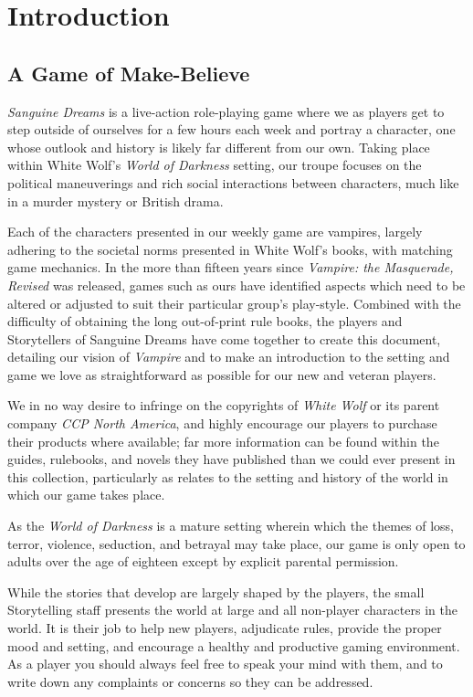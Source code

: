 \section{Introduction}
\label{sec:introduction}
\subsection{A Game of Make-Believe}
\emph{Sanguine Dreams} is a live-action role-playing game where we as players get to 
step outside of ourselves for a few hours each week and portray a character, one whose 
outlook and history is likely far different from our own.  Taking place within White 
Wolf's \emph{World of Darkness} setting, our troupe focuses on the political maneuverings 
and rich social interactions between characters, much like in a murder mystery or British drama.

Each of the characters presented in our weekly game are vampires, largely adhering to the 
societal norms presented in White Wolf's books, with matching game mechanics. In the more 
than fifteen years since \emph{Vampire: the Masquerade, Revised} was released, games such 
as ours have identified aspects which need to be altered or adjusted to suit their 
particular group's play-style.  Combined with the difficulty of obtaining the long
out-of-print rule books, the players and Storytellers of Sanguine Dreams have come together 
to create this document, detailing our vision of \emph{Vampire} and to make an introduction 
to the setting and game we love as straightforward as possible for our new and veteran players. 

We in no way desire to infringe on the copyrights of \emph{White Wolf} or its parent 
company \emph{CCP North America}, and highly encourage our players to purchase their products 
where available; far more information can be found within the guides, rulebooks, and novels 
they have published than we could ever present in this collection, particularly as relates to the 
setting and history of the world in which our game takes place.

As the \emph{World of Darkness} is a mature setting wherein which the themes of loss, 
terror, violence, seduction, and betrayal may take place, our game is only open to 
adults over the age of eighteen except by explicit parental permission.

While the stories that develop are largely shaped by the players, the small Storytelling 
staff presents the world at large and all non-player characters in the world.  It is their 
job to help new players, adjudicate rules, provide the proper mood and setting, and 
encourage a healthy and productive gaming environment.  As a player you should always feel 
free to speak your mind with them, and to write down any complaints or concerns so they 
can be addressed.

